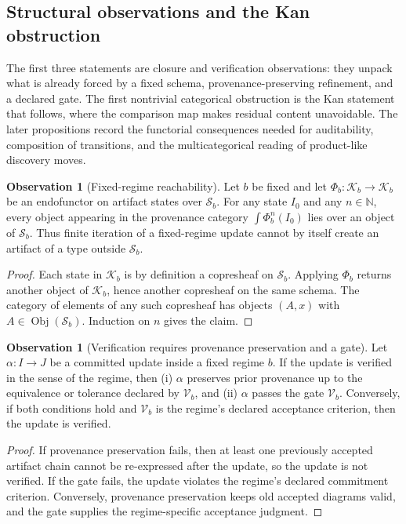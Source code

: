\documentclass[11pt]{article}
\theoremstyle{definition}
\newtheorem{observation}[theorem]{Observation}
\newcommand{\K}{\mathcal{K}}
\newcommand{\Sschema}{\mathcal{S}}
\newcommand{\V}{\mathcal{V}}
\newcommand{\Obj}{\operatorname{Obj}}
\newcommand{\N}{\mathbb{N}}
\begin{document}
\subsection{Structural observations and the Kan obstruction}

The first three statements are closure and verification observations: they unpack what is already forced by a fixed schema, provenance-preserving refinement, and a declared gate. The first nontrivial categorical obstruction is the Kan statement that follows, where the comparison map makes residual content unavoidable. The later propositions record the functorial consequences needed for auditability, composition of transitions, and the multicategorical reading of product-like discovery moves.

\begin{observation}[Fixed-regime reachability]
\label{obs:reachability}
Let $b$ be fixed and let $\Phi_b:\K_b\to\K_b$ be an endofunctor on artifact states over $\Sschema_b$. For any state $I_0$ and any $n\in\N$, every object appearing in the provenance category $\int \Phi_b^n(I_0)$ lies over an object of $\Sschema_b$. Thus finite iteration of a fixed-regime update cannot by itself create an artifact of a type outside $\Sschema_b$.
\end{observation}

\begin{proof}
Each state in $\K_b$ is by definition a copresheaf on $\Sschema_b$. Applying $\Phi_b$ returns another object of $\K_b$, hence another copresheaf on the same schema. The category of elements of any such copresheaf has objects $(A,x)$ with $A\in\Obj(\Sschema_b)$. Induction on $n$ gives the claim.
\end{proof}

\begin{observation}[Verification requires provenance preservation and a gate]
\label{obs:verification}
Let $\alpha:I\to J$ be a committed update inside a fixed regime $b$. If the update is verified in the sense of the regime, then (i) $\alpha$ preserves prior provenance up to the equivalence or tolerance declared by $\V_b$, and (ii) $\alpha$ passes the gate $\V_b$. Conversely, if both conditions hold and $\V_b$ is the regime's declared acceptance criterion, then the update is verified.
\end{observation}

\begin{proof}
If provenance preservation fails, then at least one previously accepted artifact chain cannot be re-expressed after the update, so the update is not verified. If the gate fails, the update violates the regime's declared commitment criterion. Conversely, provenance preservation keeps old accepted diagrams valid, and the gate supplies the regime-specific acceptance judgment.
\end{proof}
\end{document}
